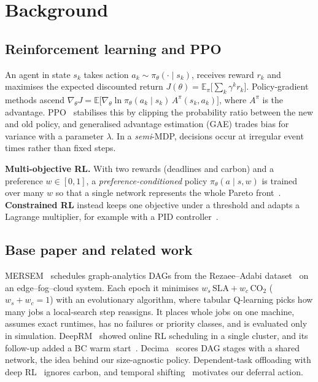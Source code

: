 \documentclass[conference]{IEEEtran}
\begin{document}
\section{Background}\label{sec:background}

\subsection{Reinforcement learning and PPO}
An agent in state $s_k$ takes action $a_k\sim\pi_\theta(\cdot\mid s_k)$, receives reward $r_k$ and maximises the expected discounted return $J(\theta)=\mathbb E_\pi\big[\sum_k\gamma^k r_k\big]$. Policy-gradient methods ascend $\nabla_\theta J=\mathbb E\big[\nabla_\theta\ln\pi_\theta(a_k\mid s_k)\,A^\pi(s_k,a_k)\big]$, where $A^\pi$ is the advantage. PPO~\cite{ppo} stabilises this by clipping the probability ratio between the new and old policy, and generalised advantage estimation (GAE) trades bias for variance with a parameter $\lambda$. In a \emph{semi}-MDP, decisions occur at irregular event times rather than fixed steps.

\textbf{Multi-objective RL.} With two rewards (deadlines and carbon) and a preference $w\in[0,1]$, a \emph{preference-conditioned} policy $\pi_\theta(a\mid s,w)$ is trained over many $w$ so that a single network represents the whole Pareto front~\cite{abels2019,yang2019}. \textbf{Constrained RL} instead keeps one objective under a threshold and adapts a Lagrange multiplier, for example with a PID controller~\cite{stooke2020}.

\subsection{Base paper and related work}
MERSEM~\cite{mersem} schedules graph-analytics DAGs from the Rezaee--Adabi dataset~\cite{dataset} on an edge--fog--cloud system. Each epoch it minimises $w_s\,\mathrm{SLA}+w_c\,\mathrm{CO}_2$ ($w_s+w_c=1$) with an evolutionary algorithm, where tabular Q-learning picks how many jobs a local-search step reassigns. It places whole jobs on one machine, assumes exact runtimes, has no failures or priority classes, and is evaluated only in simulation. DeepRM~\cite{deeprm} showed online RL scheduling in a single cluster, and its follow-up added a BC warm start~\cite{deeprm2}. Decima~\cite{decima} scores DAG stages with a shared network, the idea behind our size-agnostic policy. Dependent-task offloading with deep RL~\cite{wang2021} ignores carbon, and temporal shifting~\cite{wiesner2021} motivates our deferral action.
\end{document}
